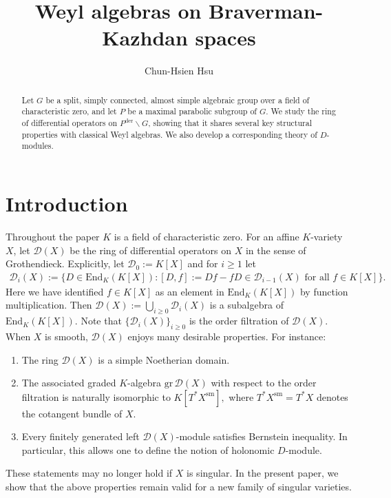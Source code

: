 \documentclass[11pt,a4paper,usenames,dvipsnames,reqno]{amsart}
\title[Weyl algebras on Braverman-Kazhdan spaces]{Weyl algebras on Braverman-Kazhdan spaces}
\author{Chun-Hsien Hsu}
\numberwithin{equation}{section}
\theoremstyle{definition}
\theoremstyle{remark}
\begin{document}
\begin{abstract}
Let $G$ be a split, simply connected, almost simple algebraic group over a field of characteristic zero, and let $P$ be a maximal parabolic subgroup of $G$. We study the ring of differential operators on $P^{\mathrm{der}}\backslash G$, showing that it shares several key structural properties with classical Weyl algebras. We also develop a corresponding theory of $D$-modules.
\end{abstract}

\maketitle
\setcounter{tocdepth}{1}
\tableofcontents


\section{Introduction}

Throughout the paper $K$ is a field of characteristic zero. For an affine $K$-variety $X$, let $\mathcal{D}(X)$ be the ring of differential operators on $X$ in the sense of Grothendieck. Explicitly, let $\mathcal{D}_0:=K[X]$ and for $i\ge 1$ let
\begin{align*}
    \mathcal{D}_i(X):=\{ D\in \mathrm{End}_K (K[X]): [D,f]:=Df-fD\in \mathcal{D}_{i-1}(X) \textrm{ for all } f\in K[X]\}.
\end{align*}
Here we have identified $f\in K[X]$ as an element in $\mathrm{End}_K (K[X])$ by function multiplication. Then $\mathcal{D}(X):=\bigcup_{i\ge 0} \mathcal{D}_i(X)$ is a subalgebra of $\mathrm{End}_K (K[X]).$ Note that $\{\mathcal{D}_i(X)\}_{i\ge 0}$ is the order filtration of $\mathcal{D}(X)$.  When $X$ is smooth, $\mathcal{D}(X)$ enjoys many desirable properties. For instance:
\begin{enumerate}
    \item The ring $\mathcal{D}(X)$ is a simple Noetherian domain.
    \item The associated graded $K$-algebra $\mathrm{gr}\,\mathcal{D}(X)$ with respect to the order filtration is naturally isomorphic to $K[T^\ast X^{\mathrm{sm}}],$ where $T^\ast X^{\mathrm{sm}}=T^\ast X$ denotes the cotangent bundle of $X$.
    \item Every finitely generated left $\mathcal{D}(X)$-module satisfies Bernstein inequality. In particular, this allows one to define the notion of holonomic $D$-module.
\end{enumerate}
\noindent These statements may no longer hold if $X$ is singular. In the present paper, we show that the above properties remain valid for a new family of singular varieties.
\end{document}
